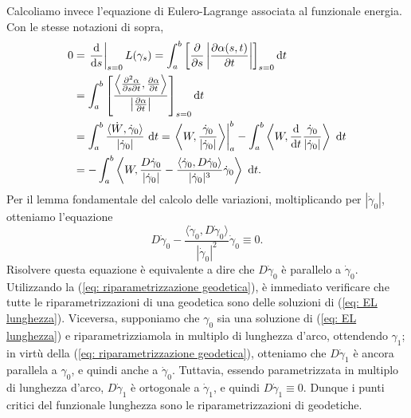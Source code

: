 	Calcoliamo invece l'equazione di Eulero-Lagrange associata al funzionale energia. Con le stesse notazioni di sopra,
	\begin{align*}
		0 &= \left.\frac{\mathrm{d}}{\mathrm{d} s}\right|_{s=0} L(\gamma_s) = \int_a^b \left[ \frac{\partial}{\partial s} \left| \frac{\partial \alpha(s,t)}{\partial t}\right| \right]_{s=0} \mathrm{d} t \\
		&= \int_a^b \left[ \frac{ \left\langle \frac{\partial^2 \alpha}{\partial s\partial t}, \frac{\partial \alpha}{\partial t} \right\rangle }{\left| \frac{\partial \alpha}{\partial t}\right|} \right]_{s=0} \mathrm{d} t \\
		& = \int_a^b \frac{\langle \dot W, \dot \gamma_0 \rangle}{|\dot \gamma_0|} \ \mathrm{d} t  = \left.\left\langle W,\frac{\dot \gamma_0}{|\dot \gamma_0|} \right\rangle\right|_a^b - \int_a^b \left\langle W,\frac{\mathrm{d}}{\mathrm{d} t} \frac{\dot \gamma_0}{|\dot \gamma_0|} \right\rangle  \ \mathrm{d} t \\
		& = -\int_a^b \left\langle W , \frac{D\dot \gamma_0}{|\dot \gamma_0|} - \frac{\langle \dot \gamma_0,D\dot \gamma_0\rangle}{|\dot \gamma_0|^3} \dot \gamma_0 \right\rangle \ \mathrm{d} t.
	\end{align*}
	Per il lemma fondamentale del calcolo delle variazioni, moltiplicando per \(|\dot \gamma_0|\), otteniamo l'equazione
	\begin{equation}\label{eq: EL lunghezza}
		D\dot \gamma_0 - \frac{\langle \dot \gamma_0,D\dot \gamma_0\rangle}{|\dot \gamma_0|^2} \dot \gamma_0 \equiv 0.
	\end{equation}
	Risolvere questa equazione è equivalente a dire che \(D \dot \gamma_0\) è parallelo a \(\dot \gamma_0\). Utilizzando la (\ref{eq: riparametrizzazione geodetica}), è immediato verificare che tutte le riparametrizzazioni di una geodetica sono delle soluzioni di (\ref{eq: EL lunghezza}). Viceversa, supponiamo che \(\gamma_0\) sia una soluzione di (\ref{eq: EL lunghezza}) e riparametrizziamola in multiplo di lunghezza d'arco, ottendendo \(\gamma_1\); in virtù della (\ref{eq: riparametrizzazione geodetica}), otteniamo che \(D\dot \gamma_1\) è ancora parallela a \(\gamma_0\), e quindi anche a \(\dot \gamma_0\). Tuttavia, essendo parametrizzata in multiplo di lunghezza d'arco, \(D\dot\gamma_1\) è ortogonale a \(\dot \gamma_1\), e quindi \(D\dot\gamma_1\equiv 0\). Dunque i punti critici del funzionale lunghezza sono le riparametrizzazioni di geodetiche.
	

	
